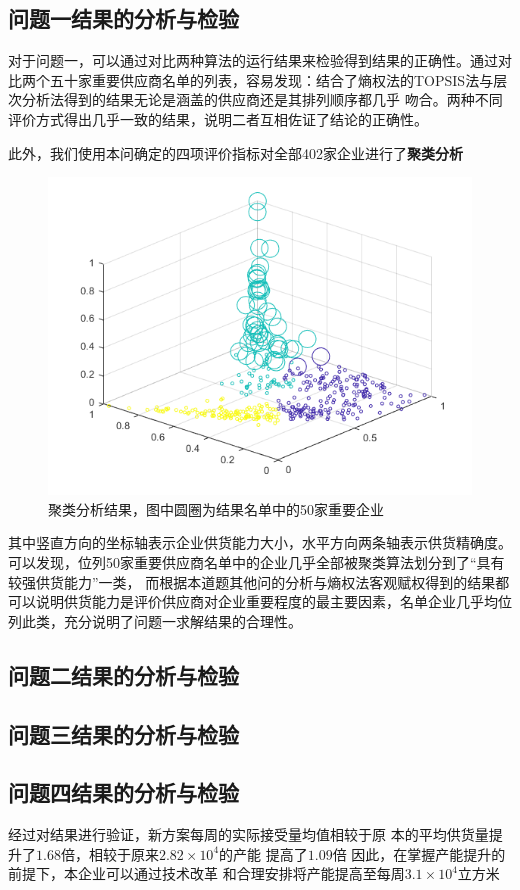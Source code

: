 \documentclass{cumcmthesis}
\begin{document}
\subsection{问题一结果的分析与检验}
对于问题一，可以通过对比两种算法的运行结果来检验得到结果的正确性。通过对比两个五十家重要供应商名单的列表，容易发现：结合了熵权法的TOPSIS法与层次分析法得到的结果无论是涵盖的供应商还是其排列顺序都几乎
吻合。两种不同评价方式得出几乎一致的结果，说明二者互相佐证了结论的正确性。\par
此外，我们使用本问确定的四项评价指标对全部402家企业进行了\textbf{聚类分析}
\begin{figure}[H]
    \centering
    \includegraphics[scale = 0.7]{julei.png}
    \centering
    \caption{聚类分析结果，图中圆圈为结果名单中的50家重要企业} \label{fig:5}
\end{figure}
其中竖直方向的坐标轴表示企业供货能力大小，水平方向两条轴表示供货精确度。可以发现，位列50家重要供应商名单中的企业几乎全部被聚类算法划分到了“具有较强供货能力”一类，
而根据本道题其他问的分析与熵权法客观赋权得到的结果都可以说明供货能力是评价供应商对企业重要程度的最主要因素，名单企业几乎均位列此类，充分说明了问题一求解结果的合理性。
\subsection{问题二结果的分析与检验}
\subsection{问题三结果的分析与检验}
\subsection{问题四结果的分析与检验}
经过对结果进行验证，新方案每周的实际接受量均值相较于原
本的平均供货量提升了$1.68$倍，相较于原来$2.82 \times 10^4$的产能
提高了$1.09$倍
因此，在掌握产能提升的前提下，本企业可以通过技术改革
和合理安排将产能提高至每周$3.1 \times 10^ 4$立方米
\end{document}
